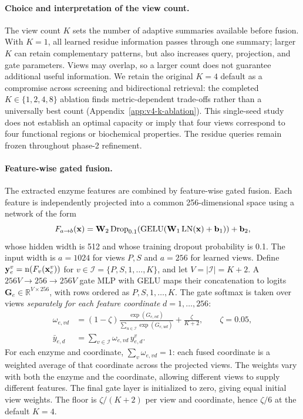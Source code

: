 \paragraph{Choice and interpretation of the view count.}
The view count $K$ sets the number of adaptive summaries available before
fusion. With $K=1$, all learned residue information passes through one
summary; larger $K$ can retain complementary patterns, but also increases
query, projection, and gate parameters. Views may overlap, so a larger count
does not guarantee additional useful information. We retain the original
$K=4$ default as a compromise across screening and bidirectional retrieval:
the completed $K\in\{1,2,4,8\}$ ablation finds metric-dependent trade-offs
rather than a universally best count (Appendix~\ref{app:v4-k-ablation}).
This single-seed study does not establish an optimal capacity or imply that
four views correspond to four functional regions or biochemical properties.
The residue queries remain frozen throughout phase-2 refinement.

\paragraph{Feature-wise gated fusion.}
The extracted enzyme features are combined by feature-wise gated fusion.
Each feature is independently projected into a common 256-dimensional space
using a network of the form
\begin{equation}
  F_{a\to b}(\mathbf{x})=\mathbf{W}_2\operatorname{Drop}_{0.1}\!\left(\operatorname{GELU}(\mathbf{W}_1\operatorname{LN}(\mathbf{x})+\mathbf{b}_1)\right)+\mathbf{b}_2,
  \label{eq:v4-protein-ffn}
\end{equation}
whose hidden width is 512 and whose training dropout probability is 0.1.
The input width is $a=1024$ for views $P,S$ and $a=256$ for learned views.
Define $\mathbf{y}_e^{v}=\operatorname{n}(F_v(\mathbf{x}_e^{v}))$ for
$v\in\mathcal I=\{P,S,1,\ldots,K\}$, and let $V=|\mathcal I|=K+2$.
A $256V\!\to\!256\!\to\!256V$ gate MLP with GELU maps their concatenation
to logits $\mathbf{G}_e\in\mathbb{R}^{V\times256}$, with rows ordered as
$P,S,1,\ldots,K$. The gate softmax is taken over
views \emph{separately for each feature coordinate} $d=1,\ldots,256$:
\begin{align}
  \omega_{e,vd}
    &=(1-\zeta)\frac{\exp(G_{e,vd})}{\sum_{u\in\mathcal I}\exp(G_{e,ud})}
       +\frac{\zeta}{K+2},\qquad \zeta=0.05,\\
  \bar y_{e,d}&=\sum_{v\in\mathcal I}\omega_{e,vd}\,y_{e,d}^{v}.
  \label{eq:v4-view-gate}
\end{align}
For each enzyme and coordinate, $\sum_v\omega_{e,vd}=1$: each fused coordinate
is a weighted average of that coordinate across the projected views.
The weights vary with both the enzyme and the coordinate, allowing different
views to supply different features. The final gate layer is initialized to
zero, giving equal initial view weights. The floor is $\zeta/(K+2)$ per view
and coordinate, hence $\zeta/6$ at the default $K=4$.

